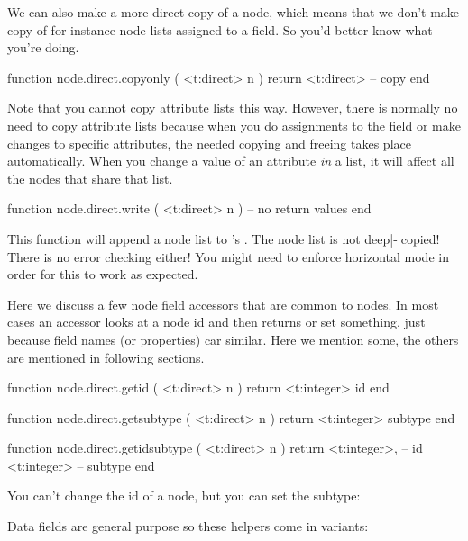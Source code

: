We can also make a more direct copy of a node, which means that we don't make
copy of for instance node lists assigned to a field. So you'd better know what
you're doing.

\starttyping[option=LUA]
function node.direct.copyonly ( <t:direct> n )
    return <t:direct> -- copy
end
\stoptyping

Note that you cannot copy attribute lists this way. However, there is normally no
need to copy attribute lists because when you do assignments to the 
field or make changes to specific attributes, the needed copying and freeing
takes place automatically. When you change a value of an attribute {\em in} a
list, it will affect all the nodes that share that list.

\starttyping[option=LUA]
function node.direct.write ( <t:direct> n )
    -- no return values
end
\stoptyping

This function will append a node list to \TEX's . The node
list is not deep|-|copied! There is no error checking either! You might need to
enforce horizontal mode in order for this to work as expected.

\stopsubsection

\startsubsection[title={Common properties}]

Here we discuss a few node field accessors that are common to nodes. In most
cases an accessor looks at a node id and then returns or set something, just
because field names (or properties) car similar. Here we mention some, the others
are mentioned in following sections.

\starttyping[option=LUA]
function node.direct.getid ( <t:direct> n )
    return <t:integer> id
end

function node.direct.getsubtype ( <t:direct> n )
    return <t:integer> subtype
end

function node.direct.getidsubtype ( <t:direct> n )
    return
        <t:integer>, -- id
        <t:integer>  -- subtype
end
\stoptyping

You can't change the id of a node, but you can set the subtype:



Data fields are general purpose so these helpers come in variants:

